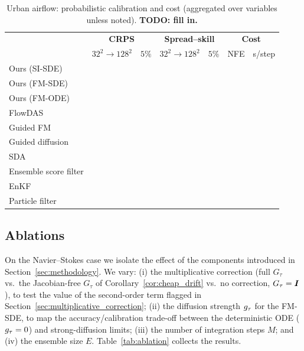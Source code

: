 \begin{table}[ht]
    \centering
    \small
    \caption{Urban airflow: probabilistic calibration and cost (aggregated over variables unless noted). \textbf{TODO: fill in.}}
    \label{tab:urban_calibration_cost}
    \begin{tabular}{l|cc|cc|cc}
        \toprule
        & \multicolumn{2}{c|}{\textbf{CRPS}}
        & \multicolumn{2}{c|}{\textbf{Spread--skill}}
        & \multicolumn{2}{c}{\textbf{Cost}} \\
        & $32^2\!\to\!128^2$ & $5\%$ & $32^2\!\to\!128^2$ & $5\%$ & NFE & s/step \\
        \midrule
        Ours (SI-SDE) & & & & & & \\
        Ours (FM-SDE) & & & & & & \\
        Ours (FM-ODE) & & & & & & \\
        \midrule
        FlowDAS \cite{chen_flowdas_2025} & & & & & & \\
        Guided FM \cite{yan_fig_2024} & & & & & & \\
        Guided diffusion \cite{chung_diffusion_2023} & & & & & & \\
        SDA \cite{rozet_score-based_2023} & & & & & & \\
        Ensemble score filter \cite{bao_ensemble_2024} & & & & & & \\
        EnKF \cite{evensen_data_2022} & & & & & & \\
        Particle filter \cite{carrassi_data_2018} & & & & & & \\
        \bottomrule
    \end{tabular}
\end{table}

\subsection{Ablations}
\label{subsec:results_ablations}
On the Navier--Stokes case we isolate the effect of the components introduced in Section~\ref{sec:methodology}. We vary: (i) the multiplicative correction (full $G_\tau$ vs.\ the Jacobian-free $G_\tau$ of Corollary~\ref{cor:cheap_drift} vs.\ no correction, $G_\tau=\bm{I}$), to test the value of the second-order term flagged in Section~\ref{sec:multiplicative_correction}; (ii) the diffusion strength $g_\tau$ for the FM-SDE, to map the accuracy/calibration trade-off between the deterministic ODE ($g_\tau=0$) and strong-diffusion limits; (iii) the number of integration steps $M$; and (iv) the ensemble size $E$. Table~\ref{tab:ablation} collects the results.

